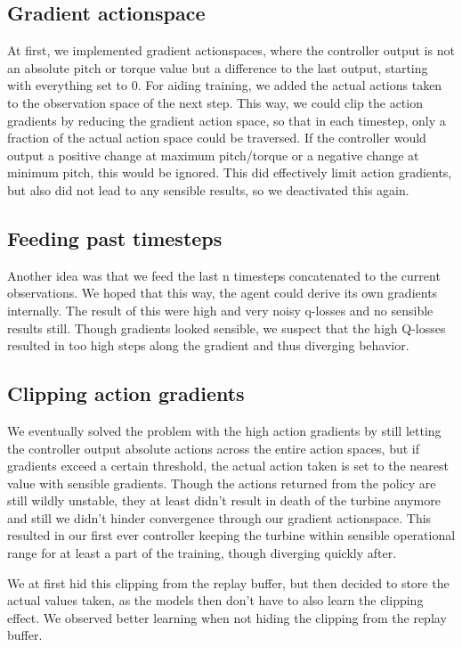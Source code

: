 \documentclass[hyperref,german,beleg]{cgvpub}
\begin{document}
\subsection{Gradient actionspace}

At first, we implemented gradient actionspaces, where the controller output is not an absolute pitch or torque value but a difference to the last output, starting with everything set to 0. For aiding training, we added the actual actions taken to the observation space of the next step. This way, we could clip the action gradients by reducing the gradient action space, so that in each timestep, only a fraction of the actual action space could be traversed. If the controller would output a positive change at maximum pitch/torque or a negative change at minimum pitch, this would be ignored. This did effectively limit action gradients, but also did not lead to any sensible results, so we deactivated this again.

\subsection{Feeding past timesteps}

Another idea was that we feed the last n timesteps concatenated to the current observations. We hoped that this way, the agent could derive its own gradients internally. The result of this were high and very noisy q-losses and no sensible results still. Though gradients looked sensible, we suspect that the high Q-losses resulted in too high steps along the gradient and thus diverging behavior. 

\subsection{Clipping action gradients}

We eventually solved the problem with the high action gradients by still letting the controller output absolute actions across the entire action spaces, but if gradients exceed a certain threshold, the actual action taken is set to the nearest value with sensible gradients. Though the actions returned from the policy are still wildly unstable, they at least didn't result in death of the turbine anymore and still we didn't hinder convergence through our gradient actionspace. This resulted in our first ever controller keeping the turbine within sensible operational range for at least a part of the training, though diverging quickly after.

We at first hid this clipping from the replay buffer, but then decided to store the actual values taken, as the models then don't have to also learn the clipping effect. We observed better learning when not hiding the clipping from the replay buffer.
\end{document}
